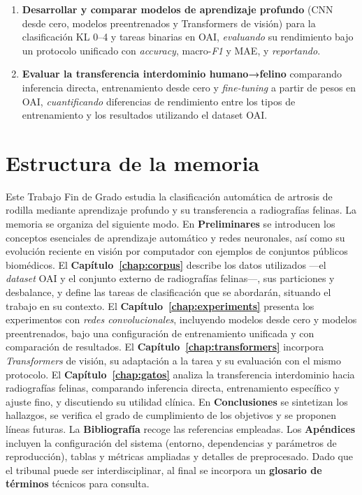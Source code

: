 \documentclass[11pt,spanish,listoffigures,listoftables]{tfgetsinf}
\begin{document}
\begin{enumerate}
\item \textbf{Desarrollar y comparar modelos de aprendizaje profundo} (CNN desde cero, modelos preentrenados y Transformers de visión) para la clasificación KL 0--4 y tareas binarias en OAI, \textit{evaluando} su rendimiento bajo un protocolo unificado con \textit{accuracy}, macro-\textit{F1} y MAE, y \textit{reportando}.
\item \textbf{Evaluar la transferencia interdominio humano→felino} comparando inferencia directa, entrenamiento desde cero y \textit{fine-tuning} a partir de pesos en OAI, \textit{cuantificando} diferencias de rendimiento entre los tipos de entrenamiento y los resultados utilizando el dataset OAI.
\end{enumerate}


\section*{Estructura de la memoria}
Este Trabajo Fin de Grado estudia la clasificación automática de artrosis de rodilla mediante aprendizaje profundo y su transferencia a radiografías felinas. La memoria se organiza del siguiente modo. En \textbf{Preliminares} se introducen los conceptos esenciales de aprendizaje automático y redes neuronales, así como su evolución reciente en visión por computador con ejemplos de conjuntos públicos biomédicos. El \textbf{Capítulo~\ref{chap:corpus}} describe los datos utilizados —el \emph{dataset} OAI y el conjunto externo de radiografías felinas—, sus particiones y desbalance, y define las tareas de clasificación que se abordarán, situando el trabajo en su contexto. El \textbf{Capítulo~\ref{chap:experiments}} presenta los experimentos con \emph{redes convolucionales}, incluyendo modelos desde cero y modelos preentrenados, bajo una configuración de entrenamiento unificada y con comparación de resultados. El \textbf{Capítulo~\ref{chap:transformers}} incorpora \emph{Transformers} de visión, su adaptación a la tarea y su evaluación con el mismo protocolo. El \textbf{Capítulo~\ref{chap:gatos}} analiza la transferencia interdominio hacia radiografías felinas, comparando inferencia directa, entrenamiento específico y ajuste fino, y discutiendo su utilidad clínica. En \textbf{Conclusiones} se sintetizan los hallazgos, se verifica el grado de cumplimiento de los objetivos y se proponen líneas futuras. La \textbf{Bibliografía} recoge las referencias empleadas. Los \textbf{Apéndices} incluyen la configuración del sistema (entorno, dependencias y parámetros de reproducción), tablas y métricas ampliadas y detalles de preprocesado. Dado que el tribunal puede ser interdisciplinar, al final se incorpora un \textbf{glosario de términos} técnicos para consulta.
\end{document}
